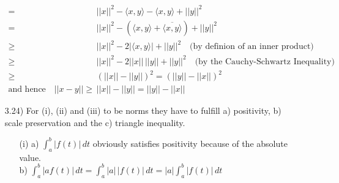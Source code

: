 \documentclass[letterpaper,12pt]{article}
\theoremstyle{definition}
\begin{document}
\begin{enumerate}
\begin{align*}
=& \,  ||x||^2 - \langle x, y \rangle - \langle x, y\rangle +||y||^2 \\
=& \, ||x||^2 - (\langle x, y\rangle +\overline{\langle x, y\rangle} ) +||y||^2 \\ 
\geq &\,  ||x||^2 - 2|\langle x, y\rangle| +||y||^2 \quad \text{(by definion of an inner product)}\\  
\geq & \, ||x||^2 - 2||x||\, ||y|| +||y||^2 \quad \text{(by the Cauchy-Schwartz Inequality)}\\
\geq & \,\left( ||x|| - ||y|| \right)^2 = \left( ||y|| - ||x|| \right)^2 \\
\text{and hence} \quad ||x-y|| \geq& \, ||x|| - ||y|| =||y|| - ||x||  
\end{align*}
\item[3.24)]
For (i), (ii) and (iii)  to be norms they have to fulfill a) positivity, b) scale preservation and the c) triangle inequality.
\begin{itemize}
\item[(i)] a) $ \int_a^b |f(t)| \, dt$  obviously satisfies positivity because of the absolute value.\\

b) $ \int_a^b |af(t)| \, dt= \int_a^b |a|\, |f(t)| \, dt = |a|\int_a^b |f(t)| \, dt$ \\


\end{itemize}
\end{enumerate}
\end{document}
